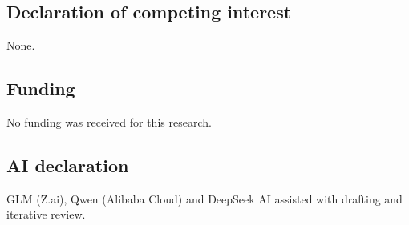 \documentclass[11pt]{article}
\begin{document}
\subsection*{Declaration of competing interest}

None.

\subsection*{Funding}

No funding was received for this research.

\subsection*{AI declaration}
GLM (Z.ai), Qwen (Alibaba Cloud) and DeepSeek AI assisted with drafting and iterative review.
\end{document}
